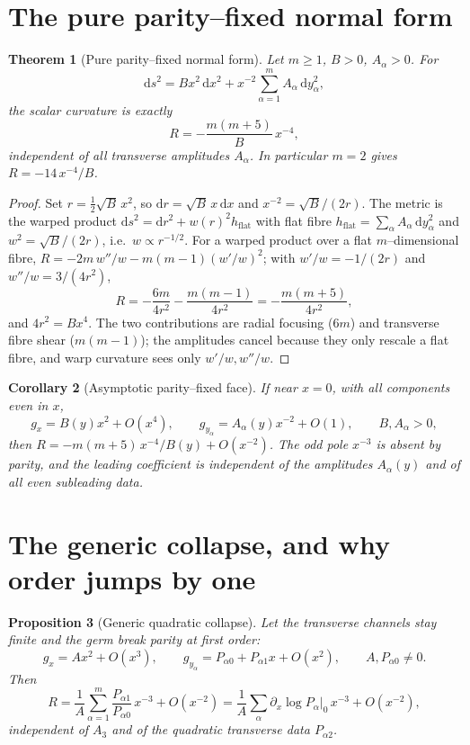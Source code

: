 \documentclass[11pt]{article}
\newtheorem{theorem}{Theorem}
\newtheorem{proposition}[theorem]{Proposition}
\newtheorem{corollary}[theorem]{Corollary}
\newcommand{\dd}{\mathrm{d}}
\begin{document}
\section{The pure parity--fixed normal form}

\begin{theorem}[Pure parity--fixed normal form]
\label{thm:pure}
Let $m\ge1$, $B>0$, $A_\alpha>0$. For
\[
\dd s^2=Bx^2\,\dd x^2+x^{-2}\sum_{\alpha=1}^{m}A_\alpha\,\dd y_\alpha^2,
\]
the scalar curvature is exactly
\[
R=-\frac{m(m+5)}{B}\,x^{-4},
\]
independent of all transverse amplitudes $A_\alpha$. In particular $m=2$ gives $R=-14\,x^{-4}/B$.
\end{theorem}

\begin{proof}
Set $r=\tfrac12\sqrt B\,x^2$, so $\dd r=\sqrt B\,x\,\dd x$ and $x^{-2}=\sqrt B/(2r)$. The metric
is the warped product $\dd s^2=\dd r^2+w(r)^2 h_{\mathrm{flat}}$ with flat fibre
$h_{\mathrm{flat}}=\sum_\alpha A_\alpha\,\dd y_\alpha^2$ and $w^2=\sqrt B/(2r)$, i.e.\ $w\propto
r^{-1/2}$. For a warped product over a flat $m$--dimensional fibre,
$R=-2m\,w''/w-m(m-1)(w'/w)^2$; with $w'/w=-1/(2r)$ and $w''/w=3/(4r^2)$,
\[
R=-\frac{6m}{4r^2}-\frac{m(m-1)}{4r^2}=-\frac{m(m+5)}{4r^2},
\]
and $4r^2=Bx^4$. The two contributions are radial focusing ($6m$) and transverse fibre shear
($m(m-1)$); the amplitudes cancel because they only rescale a flat fibre, and warp curvature
sees only $w'/w,w''/w$.
\end{proof}

\begin{corollary}[Asymptotic parity--fixed face]
\label{cor:asymp}
If near $x=0$, with all components even in $x$,
\[
g_x=B(y)x^2+O(x^4),\qquad g_{y_\alpha}=A_\alpha(y)x^{-2}+O(1),\qquad B,A_\alpha>0,
\]
then $R=-m(m+5)\,x^{-4}/B(y)+O(x^{-2})$. The odd pole $x^{-3}$ is absent by parity, and the
leading coefficient is independent of the amplitudes $A_\alpha(y)$ and of all even subleading
data.
\end{corollary}

\section{The generic collapse, and why order jumps by one}

\begin{proposition}[Generic quadratic collapse]
\label{prop:generic}
Let the transverse channels stay finite and the germ break parity at first order:
\[
g_x=Ax^2+O(x^3),\qquad g_{y_\alpha}=P_{\alpha0}+P_{\alpha1}x+O(x^2),\qquad A,P_{\alpha0}\neq0.
\]
Then
\[
R=\frac1A\sum_{\alpha=1}^{m}\frac{P_{\alpha1}}{P_{\alpha0}}\,x^{-3}+O(x^{-2})
=\frac1A\sum_{\alpha}\partial_x\log P_\alpha\Big|_{0}\,x^{-3}+O(x^{-2}),
\]
independent of $A_3$ and of the quadratic transverse data $P_{\alpha2}$.
\end{proposition}
\end{document}
